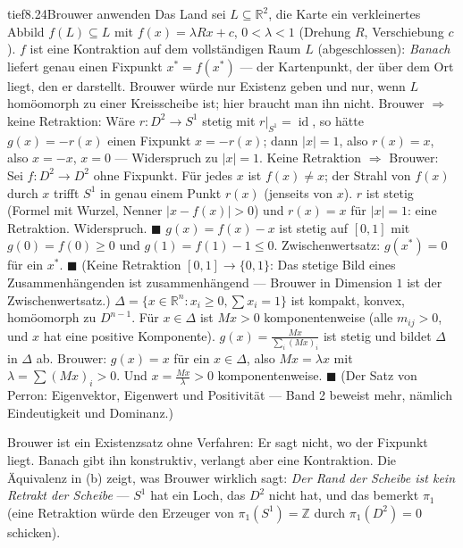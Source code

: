 \begin{loesungkarte}{tief}{8.24}{Brouwer anwenden}
Das Land sei $L\subseteq\mathbb R^{2}$, die Karte ein verkleinertes Abbild $f(L)\subseteq L$ mit $f(x) = \lambda Rx + c$, $0 < \lambda < 1$ (Drehung $R$, Verschiebung $c$). $f$ ist eine Kontraktion auf dem vollständigen Raum $L$ (abgeschlossen): \emph{Banach} liefert genau einen Fixpunkt $x^{*} = f(x^{*})$ --- der Kartenpunkt, der über dem Ort liegt, den er darstellt. Brouwer würde nur Existenz geben und nur, wenn $L$ homöomorph zu einer Kreisscheibe ist; hier braucht man ihn nicht.
Brouwer $\Rightarrow$ keine Retraktion: Wäre $r\colon D^{2}\to S^{1}$ stetig mit $r|_{S^{1}} = \operatorname{id}$, so hätte $g(x) = -r(x)$ einen Fixpunkt $x = -r(x)$; dann $|x| = 1$, also $r(x) = x$, also $x = -x$, $x = 0$ --- Widerspruch zu $|x| = 1$. Keine Retraktion $\Rightarrow$ Brouwer: Sei $f\colon D^{2}\to D^{2}$ ohne Fixpunkt. Für jedes $x$ ist $f(x)\neq x$; der Strahl von $f(x)$ durch $x$ trifft $S^{1}$ in genau einem Punkt $r(x)$ (jenseits von $x$). $r$ ist stetig (Formel mit Wurzel, Nenner $|x - f(x)| > 0$) und $r(x) = x$ für $|x| = 1$: eine Retraktion. Widerspruch. $\blacksquare$
$g(x) = f(x) - x$ ist stetig auf $[0, 1]$ mit $g(0) = f(0)\ge0$ und $g(1) = f(1) - 1\le0$. Zwischenwertsatz: $g(x^{*}) = 0$ für ein $x^{*}$. $\blacksquare$ (Keine Retraktion $[0, 1]\to\{0, 1\}$: Das stetige Bild eines Zusammenhängenden ist zusammenhängend --- Brouwer in Dimension $1$ ist der Zwischenwertsatz.)
$\Delta = \{x\in\mathbb R^{n}\colon x_i\ge0, \sum x_i = 1\}$ ist kompakt, konvex, homöomorph zu $D^{n-1}$. Für $x\in\Delta$ ist $Mx > 0$ komponentenweise (alle $m_{ij} > 0$, und $x$ hat eine positive Komponente). $g(x) = \frac{Mx}{\sum_i(Mx)_i}$ ist stetig und bildet $\Delta$ in $\Delta$ ab. Brouwer: $g(x) = x$ für ein $x\in\Delta$, also $Mx = \lambda x$ mit $\lambda = \sum(Mx)_i > 0$. Und $x = \frac{Mx}\lambda > 0$ komponentenweise. $\blacksquare$ (Der Satz von Perron: Eigenvektor, Eigenwert und Positivität --- Band 2 beweist mehr, nämlich Eindeutigkeit und Dominanz.)
\begin{mitnehmen}\kastentext
Brouwer ist ein Existenzsatz ohne Verfahren: Er sagt nicht, wo der Fixpunkt liegt. Banach gibt ihn konstruktiv, verlangt aber eine Kontraktion. Die Äquivalenz in (b) zeigt, was Brouwer wirklich sagt: \emph{Der Rand der Scheibe ist kein Retrakt der Scheibe} --- $S^{1}$ hat ein Loch, das $D^{2}$ nicht hat, und das bemerkt $\pi_1$ (eine Retraktion würde den Erzeuger von $\pi_1(S^{1}) = \mathbb Z$ durch $\pi_1(D^{2}) = 0$ schicken).
\end{mitnehmen}
\end{loesungkarte}


